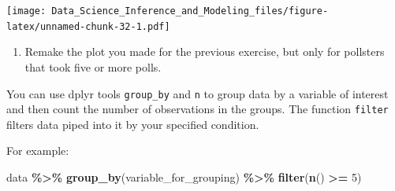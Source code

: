 \documentclass[
]{article}
\newenvironment{Shaded}{\begin{snugshade}}{\end{snugshade}}
\newcommand{\CommentTok}[1]{\textcolor[rgb]{0.56,0.35,0.01}{\textit{#1}}}
\newcommand{\DataTypeTok}[1]{\textcolor[rgb]{0.13,0.29,0.53}{#1}}
\newcommand{\DecValTok}[1]{\textcolor[rgb]{0.00,0.00,0.81}{#1}}
\newcommand{\FloatTok}[1]{\textcolor[rgb]{0.00,0.00,0.81}{#1}}
\newcommand{\KeywordTok}[1]{\textcolor[rgb]{0.13,0.29,0.53}{\textbf{#1}}}
\newcommand{\NormalTok}[1]{#1}
\newcommand{\OperatorTok}[1]{\textcolor[rgb]{0.81,0.36,0.00}{\textbf{#1}}}
\newcommand{\StringTok}[1]{\textcolor[rgb]{0.31,0.60,0.02}{#1}}
\providecommand{\tightlist}{%
  \setlength{\itemsep}{0pt}\setlength{\parskip}{0pt}}
\begin{document}
\begin{Shaded}
\end{Shaded}

\texttt{[image: Data\_Science\_Inference\_and\_Modeling\_files/figure-latex/unnamed-chunk-32-1.pdf]}

\begin{enumerate}
\def\labelenumi{\arabic{enumi}.}
\setcounter{enumi}{8}
\tightlist
\item
  Remake the plot you made for the previous exercise, but only for
  pollsters that took five or more polls.
\end{enumerate}

You can use dplyr tools \texttt{group\_by} and \texttt{n} to group data
by a variable of interest and then count the number of observations in
the groups. The function \texttt{filter} filters data piped into it by
your specified condition.

For example:

\begin{Shaded}
\begin{Highlighting}[]
\NormalTok{data }\OperatorTok{\%\textgreater{}\%}\StringTok{ }\KeywordTok{group\_by}\NormalTok{(variable\_for\_grouping) }
    \OperatorTok{\%\textgreater{}\%}\StringTok{ }\KeywordTok{filter}\NormalTok{(}\KeywordTok{n}\NormalTok{() }\OperatorTok{\textgreater{}=}\StringTok{ }\DecValTok{5}\NormalTok{)}
\end{Highlighting}
\end{Shaded}
\end{document}
